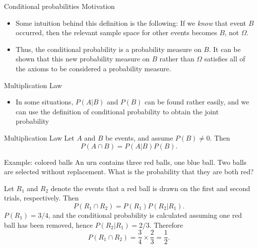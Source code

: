 \begin{frame}[allowframebreaks]{Conditional probabilities Motivation}
  \begin{itemize}
    \item Some intuition behind this definition is the following: If we \emph{know} that event $B$ occurred, then the relevant sample space for other events becomes $B$, not $\Omega$.
    \item Thus, the conditional probability is a probability measure on $B$. It can be shown that this new probability measure on $B$ rather than $\Omega$ satisfies all of the axioms to be considered a probability measure.
  \end{itemize}
  
\end{frame}

\begin{frame}[allowframebreaks]{Multiplication Law}

  \begin{itemize}
    \item In some situations, $P(A|B)$ and $P(B)$ can be found rather easily, and we can use the definition of conditional probability to obtain the joint probability
  \end{itemize}
  \begin{block}{Multiplication Law}
    Let $A$ and $B$ be events, and assume $P(B) \neq 0$. Then
    $$
    P(A \cap B) = P(A|B)P(B).
    $$
  \end{block}
  
  \begin{exampleblock}{Example: colored balls}
    An urn contains three red balls, one blue ball. Two balls are selected without replacement. What is the probability that they are both red? 
    
    Let $R_1$ and $R_2$ denote the events that a red ball is drawn on the first and second trials, respectively. Then
    $$
    P(R_1 \cap R_2) = P(R_1)P(R_2 | R_1).
    $$
    $P(R_1) = 3/4$, and the conditional probability is calculated assuming one red ball has been removed, hence $P(R_2 | R_1) = 2/3$. Therefore
    $$
    P(R_1 \cap R_2) = \frac{3}{4}\times\frac{2}{3} = \frac{1}{2}.
    $$
  \end{exampleblock}
\end{frame}

